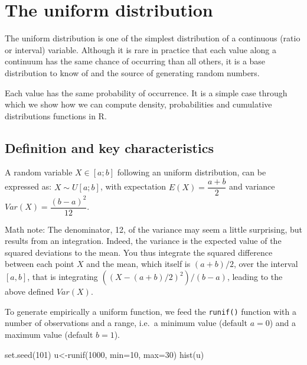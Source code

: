 \documentclass[
  letterpaper,
  DIV=11,
  numbers=noendperiod]{scrreprt}
\newenvironment{Shaded}{\begin{snugshade}}{\end{snugshade}}
\newcommand{\AttributeTok}[1]{\textcolor[rgb]{0.40,0.45,0.13}{#1}}
\newcommand{\DecValTok}[1]{\textcolor[rgb]{0.68,0.00,0.00}{#1}}
\newcommand{\FunctionTok}[1]{\textcolor[rgb]{0.28,0.35,0.67}{#1}}
\newcommand{\NormalTok}[1]{\textcolor[rgb]{0.00,0.23,0.31}{#1}}
\newcommand{\OtherTok}[1]{\textcolor[rgb]{0.00,0.23,0.31}{#1}}
\begin{document}
\section{The uniform distribution}\label{the-uniform-distribution}

The uniform distribution is one of the simplest distribution of a
continuous (ratio or interval) variable. Although it is rare in practice
that each value along a continuum has the same chance of occurring than
all others, it is a base distribution to know of and the source of
generating random numbers.

Each value has the same probability of occurrence. It is a simple case
through which we show how we can compute density, probabilities and
cumulative distributions functions in R.

\subsection{Definition and key
characteristics}\label{definition-and-key-characteristics}

A random variable \(X \in [a;b]\) following an uniform distribution, can
be expressed as: \(X \sim U[a;b]\), with expectation
\(E(X) = \dfrac{a+b}{2}\) and variance \(Var(X) = \dfrac{(b-a)^2}{12}\).

Math note: The denominator, 12, of the variance may seem a little
surprising, but results from an integration. Indeed, the variance is the
expected value of the squared deviations to the mean. You thus integrate
the squared difference between each point \(X\) and the mean, which
itself is \((a+b)/2\), over the interval \([a, b]\), that is integrating
\(((X-(a+b)/2)^2)/(b-a)\), leading to the above defined \(Var(X)\).

To generate empirically a uniform function, we feed the \texttt{runif()}
function with a number of observations and a range, i.e.~a minimum value
(default \(a=0\)) and a maximum value (default \(b=1\)).

\begin{Shaded}
\begin{Highlighting}[]
\FunctionTok{set.seed}\NormalTok{(}\DecValTok{101}\NormalTok{)}
\NormalTok{u}\OtherTok{\textless{}{-}}\FunctionTok{runif}\NormalTok{(}\DecValTok{1000}\NormalTok{, }\AttributeTok{min=}\DecValTok{10}\NormalTok{, }\AttributeTok{max=}\DecValTok{30}\NormalTok{)}
\FunctionTok{hist}\NormalTok{(u)}
\end{Highlighting}
\end{Shaded}
\end{document}
